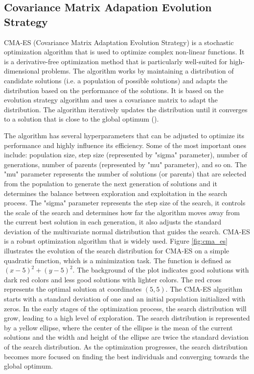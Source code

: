 \subsection{Covariance Matrix Adapation Evolution Strategy}
CMA-ES (Covariance Matrix Adaptation Evolution Strategy) is a stochastic optimization algorithm that is used to optimize complex non-linear functions. It is a derivative-free optimization method that is particularly well-suited for high-dimensional problems. The algorithm works by maintaining a distribution of candidate solutions (i.e. a population of possible solutions) and adapts the distribution based on the performance of the solutions. It is based on the evolution strategy algorithm and uses a covariance matrix to adapt the distribution. The algorithm iteratively updates the distribution until it converges to a solution that is close to the global optimum (\cite{akimoto_theoretical_2012}).

The algorithm has several hyperparameters that can be adjusted to optimize its performance and highly influence its efficiency. Some of the most important ones include: population size, step size (represented by "sigma" parameter), number of generations, number of parents (represented by "mu" parameter), and so on. The "mu" parameter represents the number of solutions (or parents) that are selected from the population to generate the next generation of solutions and it determines the balance between exploration and exploitation in the search process. The "sigma" parameter represents the step size of the search, it controls the scale of the search and determines how far the algorithm moves away from the current best solution in each generation, it also adjusts the standard deviation of the multivariate normal distribution that guides the search. CMA-ES is a robust optimization algorithm that is widely used. Figure \ref{fig:cma_es} illustrates the evolution of the search distribution for CMA-ES on a simple quadratic function, which is a minimization task. The function is defined as $(x - 5) ^ 2 + (y - 5) ^ 2$. The background of the plot indicates good solutions with dark red colors and less good solutions with lighter colors. The red cross represents the optimal solution at coordinates $(5,5)$. The CMA-ES algorithm starts with a standard deviation of one and an initial population initialized with zeros. In the early stages of the optimization process, the search distribution will grow, leading to a high level of exploration. The search distribution is represented by a yellow ellipse, where the center of the ellipse is the mean of the current solutions and the width and height of the ellipse are twice the standard deviation of the search distribution. As the optimization progresses, the search distribution becomes more focused on finding the best individuals and converging towards the global optimum.

